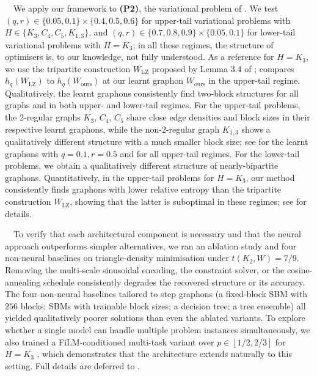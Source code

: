 \documentclass{article}
\theoremstyle{plain}
\theoremstyle{definition}
\theoremstyle{remark}
\begin{document}
\ $\,$
We apply our framework to \textbf{(P2)}, the variational problem of \citet{chatterjee2011large}. 
We test $(q, r) \in \{0.05, 0.1\} \times \{0.4, 0.5, 0.6\}$ for upper-tail variational problems with $H \in \{K_3, C_4, C_5, K_{1,3}\}$, and $(q, r) \in \{0.7, 0.8, 0.9\} \times \{0.05, 0.1\}$ for lower-tail variational problems with $H = K_3$; in all these regimes, the structure of optimisers is, to our knowledge, not fully understood. As a reference for $H = K_3$, we use the tripartite construction $W_{\mathrm{LZ}}$ proposed by Lemma 3.4 of \citet{lubetzky2015replica};  compares $h_q(W_{\mathrm{LZ}})$ to $h_q(W_{\mathrm{ours}})$ at our learnt graphon $W_{\mathrm{ours}}$ in the upper-tail regime.
Qualitatively, the learnt graphons consistently find two-block structures for all graphs and in both upper- and lower-tail regimes.
For the upper-tail problems, the 2-regular graphs $K_3$, $C_4$, $C_5$ share close edge densities and block sizes in their respective learnt graphons, while the non-2-regular graph $K_{1,3}$ shows a qualitatively different structure with a much smaller block size; see  for the learnt graphons with $q=0.1, r=0.5$ and  for all upper-tail regimes.
For the lower-tail problems, we obtain a qualitatively different structure of nearly-bipartite graphons.
Quantitatively, in the upper-tail problems for $H = K_3$, our method consistently finds graphons with lower relative entropy than the tripartite construction $W_{\mathrm{LZ}}$, showing that the latter is suboptimal in these regimes; see  for details.

\  $\,$
To verify that each architectural component is necessary and that the neural approach outperforms simpler alternatives, we ran an ablation study and four non-neural baselines on triangle-density minimisation under $t(K_2, W) = 7/9$. Removing the multi-scale sinusoidal encoding, the constraint solver, or the cosine-annealing schedule consistently degrades the recovered structure or its accuracy. The four non-neural baselines tailored to step graphons (a fixed-block SBM with $256$ blocks; SBMs with trainable block sizes; a decision tree; a tree ensemble) all yielded qualitatively poorer solutions than even the ablated variants. To explore whether a single model can handle multiple problem instances simultaneously, we also trained a FiLM-conditioned multi-task variant over $p \in [1/2, 2/3]$ for $H = K_3$ \citep{perez2018film}, which demonstrates that the architecture extends naturally to this setting. Full details are deferred to .
\end{document}

